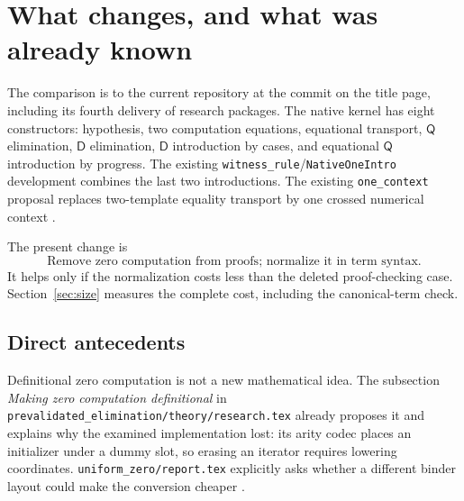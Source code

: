 \documentclass[11pt]{article}
\newcommand{\Q}{\mathsf Q}\newcommand{\D}{\mathsf D}
\newcommand{\code}[1]{\nolinkurl{#1}}
\begin{document}
\begin{abstract}
The native ConciseIPRA calculus uses numerical iterator terms, equations,
and two binders \(\Q,\D\). Its current reductions already remove separate
logical axioms and combine the case and induction introductions. We
complete an earlier suggested reduction: use the normal forms of the
single erasing rewrite \(I(0,a;u.h)\to a\) as terms. Hereditary substitution
then absorbs zero computation, leaving successor computation as the sole
nonlogical axiom schema. A different closed representative of zero,
\(K=I(1,0;u.0)\), preserves the single-introduction construction.
We give all six rules, effective translations in both directions, both
round trips, and the transfer of the existing full iPRA bi-interpretation.
The changed syntax, scope validation, and hereditary substitution are
charged in a matched implementation comparison.
\end{abstract}
\setcounter{tocdepth}{1}
\tableofcontents\newpage

\section{What changes, and what was already known}
The comparison is to the current repository at the commit on the title
page, including its fourth delivery of research packages. The native
kernel has eight constructors: hypothesis, two computation equations,
equational transport, \(\Q\) elimination, \(\D\) elimination,
\(\D\) introduction by cases, and equational \(\Q\) introduction by
progress. The existing \code{witness_rule}/\code{NativeOneIntro}
development combines the last two introductions. The existing
\code{one_context} proposal replaces two-template equality transport
by one crossed numerical context \cite{readme,native,oneintro,onecontext}.

The present change is
\[
 \boxed{\text{Remove zero computation from proofs; normalize it in term syntax.}}
\]
It helps only if the normalization costs less than the deleted
proof-checking case. Section~\ref{sec:size} measures the complete cost,
including the canonical-term check.

\subsection{Direct antecedents}
Definitional zero computation is not a new mathematical idea.
The subsection \emph{Making zero computation definitional} in
\code{prevalidated_elimination/theory/research.tex} already proposes it
and explains why the examined implementation lost: its arity codec
places an initializer under a dummy slot, so erasing an iterator
requires lowering coordinates. \code{uniform_zero/report.tex}
explicitly asks whether a different binder layout could make the
conversion cheaper \cite{priorzero,uniformzero}.
\end{document}
